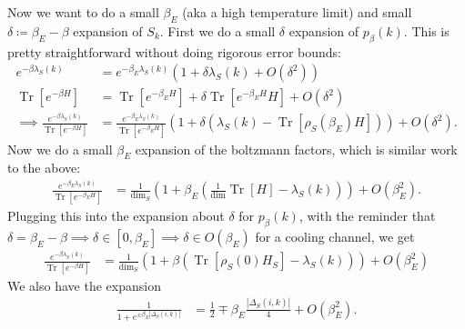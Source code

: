 \documentclass{article}
\newcommand{\parens}[1]{\left( #1 \right)}
\newcommand{\brackets}[1]{\left[ #1 \right]}
\newcommand{\bigo}[1]{O\left( #1 \right)}
\DeclareMathOperator{\Tr}{Tr}
\newcommand{\trace}[1]{\Tr \brackets{ #1 }}
\begin{document}
Now we want to do a small $\beta_E$ (aka a high temperature limit) and small $\delta \coloneqq \beta_E - \beta$ expansion of $S_k$. First we do a small $\delta$ expansion of $p_{\beta}(k)$. This is pretty straightforward without doing rigorous error bounds:
\begin{align}
    e^{-\beta \lambda_S(k)} &= e^{-\beta_E \lambda_S(k)} (1 + \delta \lambda_S(k) + \bigo{\delta^2} ) \\
    \trace{e^{-\beta H}} &= \trace{e^{-\beta_E H}} + \delta \trace{e^{-\beta_E H} H} + \bigo{\delta^2} \\
    \implies \frac{e^{-\beta \lambda_S(k)}}{\trace{e^{-\beta H}}} &= \frac{e^{-\beta_E \lambda_S(k)}}{\trace{e^{-\beta_E H}}}\parens{1 + \delta (\lambda_S(k) - \trace{\rho_S(\beta_E) H})} + \bigo{\delta^2}.
\end{align}
Now we do a small $\beta_E$ expansion of the boltzmann factors, which is similar work to the above:
\begin{align}
    \frac{e^{-\beta_E \lambda_S(k)}}{\trace{e^{-\beta_E H}}} &= \frac{1}{\dim_S}\parens{1 + \beta_E (\frac{1}{\dim} \trace{H} - \lambda_S(k))} + \bigo{\beta_E^2}.
\end{align}
Plugging this into the expansion about $\delta$ for $p_{\beta}(k)$, with the reminder that $\delta = \beta_E - \beta \implies \delta \in [0, \beta_E] \implies \delta \in \bigo{\beta_E}$ for a cooling channel, we get
\begin{align}
    \frac{e^{-\beta \lambda_S(k)}}{\trace{e^{-\beta H}}} &= \frac{1}{\dim_S}\parens{1 + \beta (\trace{\rho_S(0) H_S} - \lambda_S(k))} + \bigo{\beta_E^2}
\end{align}
We also have the expansion
\begin{align}
    \frac{1}{1 + e^{\pm \beta_E |\Delta_S(i,k)|}} &= \frac{1}{2} \mp \beta_E \frac{|\Delta_S(i,k)|}{4} + \bigo{\beta_E^2}.
\end{align}
\end{document}
